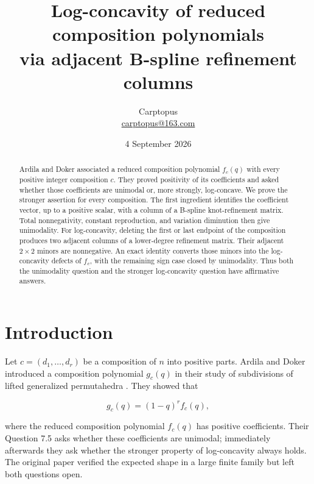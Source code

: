 \documentclass[11pt]{article}
\title{Log-concavity of reduced composition polynomials\\
via adjacent B-spline refinement columns}
\author{Carptopus\\\href{mailto:carptopus@163.com}{carptopus@163.com}}
\date{4 September 2026}
\begin{document}
\maketitle

\begin{center}
\end{center}

\begin{abstract}


Ardila and Doker associated a reduced composition polynomial $f_c(q)$ with every positive integer
composition $c$. They proved positivity of its coefficients and asked whether those coefficients are
unimodal or, more strongly, log-concave. We prove the stronger assertion for every composition.
The first ingredient identifies the coefficient vector, up to a positive scalar, with a column of a
B-spline knot-refinement matrix. Total nonnegativity, constant reproduction, and variation
diminution then give unimodality. For log-concavity, deleting the first or last endpoint of the
composition produces two adjacent columns of a lower-degree refinement matrix. Their adjacent
$2\times2$ minors are nonnegative. An exact identity converts those minors into the log-concavity
defects of $f_c$, with the remaining sign case closed by unimodality. Thus both the unimodality
question and the stronger log-concavity question have affirmative answers.

\end{abstract}

\section{Introduction}


Let $c=(d_1,\ldots,d_r)$ be a composition of $n$ into positive parts. Ardila and Doker introduced a
composition polynomial $g_c(q)$ in their study of subdivisions of lifted generalized permutahedra
\cite{ardila-doker}. They showed that

\[
g_c(q)=(1-q)^r f_c(q),
\]

where the reduced composition polynomial $f_c(q)$ has positive coefficients. Their Question 7.5
asks whether these coefficients are unimodal; immediately afterwards they ask whether the stronger
property of log-concavity always holds. The original paper verified the expected shape in a large
finite family but left both questions open.
\end{document}
